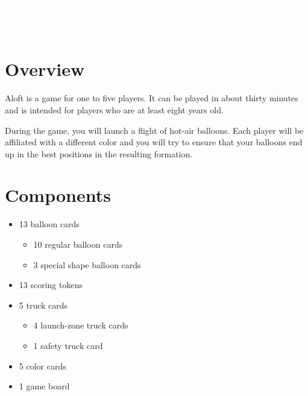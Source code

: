 \documentclass[a6paper, 11pt, parskip=half, DIV=15]{scrartcl}
\begin{document}
\begin{titlepage}

\enlargethispage{3.0\baselineskip}
\Huge
\vspace*{-1.0\baselineskip}
{
\setmainfont[Scale=2.2375]{Oi}
\begin{center}
\textcolor{white}{Aloft}
\end{center}
}
\vfill
\huge
\setmainfont[Scale=1.05]{Playball}
\begin{center}
\textcolor{white}{Designed by Michael Purcell}
\end{center}
\end{titlepage}


\ClearShipoutPicture
\enlargethispage{1.75\baselineskip}
\section*{Overview}
Aloft is a game for one to five players. It can be played in about thirty minutes and is intended for players who are at least eight years old.

During the game, you will launch a flight of hot-air balloons. Each player will be affiliated with a different color and you will try to ensure that your balloons end up in the best positions in the resulting formation.

\section*{Components}
\begin{itemize}[nosep]
  \item 13 balloon cards
    \begin{itemize}[nosep]
      \item 10 regular balloon cards
      \item 3 special shape balloon cards
    \end{itemize}
  \item 13 scoring tokens
  \item 5 truck cards
    \begin{itemize}[nosep]
      \item 4 launch-zone truck cards
      \item 1 safety truck card
    \end{itemize}
  \item 5 color cards
  \item 1 game board
\end{itemize}
\end{document}
